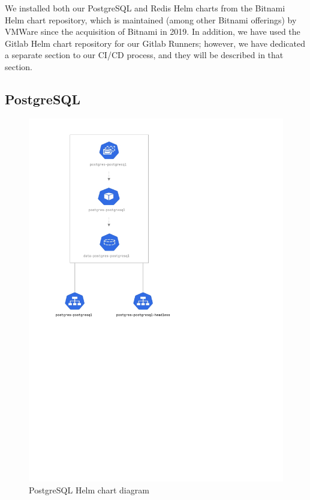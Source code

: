 \documentclass[thesis=B,english]{FITthesis}[2019/12/23]
\begin{document}
We installed both our PostgreSQL and Redis Helm charts from the Bitnami Helm chart repository, which is maintained (among other Bitnami offerings) by VMWare since the acquisition of Bitnami in 2019. \cite{bitnami} In addition, we have used the Gitlab Helm chart repository for our Gitlab Runners; however, we have dedicated a separate section to our CI/CD process, and they will be described in that section.

\subsection{PostgreSQL}

\begin{figure}[H]
\centering
\caption{PostgreSQL Helm chart diagram}
\hspace*{0.3cm}
\includegraphics[scale=0.5]{postgres-diagram}
\end{figure}
\end{document}
